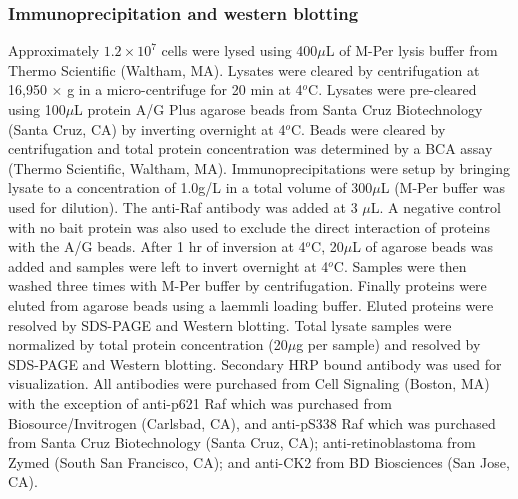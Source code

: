 \documentclass[10pt,twocolumn,twoside,final]{IEEEtran}
\begin{document}
\subsubsection*{Immunoprecipitation and western blotting}
Approximately $1.2 \times 10^7$ cells were lysed using 400$\mu$L of M-Per lysis buffer from Thermo Scientific (Waltham, MA).
Lysates were cleared by centrifugation at 16,950 $\times$ g in a micro-centrifuge for 20 min at 4$^{o}$C.
Lysates were pre-cleared using 100$\mu$L protein A/G Plus agarose beads from Santa Cruz Biotechnology (Santa Cruz, CA) by
inverting overnight at 4$^{o}$C.  Beads were cleared by centrifugation and total protein concentration
was determined by a BCA assay (Thermo Scientific, Waltham, MA).  Immunoprecipitations were setup by bringing
lysate to a concentration of 1.0g/L in a total volume of 300$\mu$L (M-Per buffer was used for dilution).
The anti-Raf antibody was added at 3 $\mu$L.
A negative control with no bait protein was also used to exclude the direct interaction of proteins with the A/G beads.
After 1 hr of inversion at 4$^{o}$C, 20$\mu$L of agarose beads was added and samples were left
to invert overnight at 4$^{o}$C. Samples were then washed three times with M-Per buffer by centrifugation.
Finally proteins were eluted from agarose beads using a laemmli loading buffer.
Eluted proteins were resolved by SDS-PAGE and Western blotting.  Total
lysate samples were normalized by total protein concentration (20$\mu$g per sample)
and resolved by SDS-PAGE and Western blotting.  Secondary HRP bound antibody was used for visualization.
All antibodies were purchased from Cell Signaling (Boston, MA) with the exception of anti-p621 Raf which was purchased from Biosource/Invitrogen  (Carlsbad, CA), and
anti-pS338 Raf which was purchased from Santa Cruz Biotechnology (Santa Cruz, CA); anti-retinoblastoma from Zymed (South San Francisco, CA); and anti-CK2 from BD Biosciences (San Jose, CA).


\end{document}
